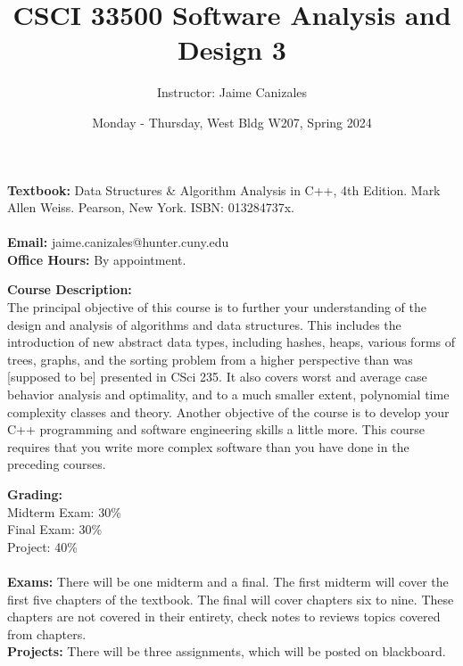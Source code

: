 \documentclass[a4paper]{article}
\title{CSCI 33500 Software Analysis and Design 3}
\author{Instructor: Jaime Canizales}
\date{Monday - Thursday, West Bldg W207, Spring 2024}
\begin{document}
\maketitle

\textbf{Textbook:} Data Structures \& Algorithm Analysis in C++, 4th Edition. Mark Allen Weiss. Pearson, New
York. ISBN: 013284737x.
\\\\
\textbf{Email:} jaime.canizales@hunter.cuny.edu \\
\textbf{Office Hours:} By appointment.

\textbf{Course Description:}\\ The principal objective of this course is to further your understanding of the design and analysis of
algorithms and data structures. This includes the introduction of new abstract data types, including
hashes, heaps, various forms of trees, graphs, and the sorting problem from a higher perspective than
was [supposed to be] presented in CSci 235. It also covers worst and average case behavior analysis
and optimality, and to a much smaller extent, polynomial time complexity classes and theory. Another
objective of the course is to develop your C++ programming and software engineering skills a little more.
This course requires that you write more complex software than you have done in the preceding courses.

\textbf{Grading: } \\
Midterm Exam: \hspace{1mm} 30\% \\
Final Exam: \hspace{6mm} 30\% \\
Project: \hspace{13mm} 40\%
\\\\
\textbf{Exams:} There will be one midterm and a final. The first midterm will cover the first five chapters of
the textbook. The final will cover chapters six to nine. These chapters are not covered in their entirety,
check notes to reviews topics covered from chapters.\\

\textbf{Projects: } There will be three assignments, which will be posted on blackboard.
\end{document}
